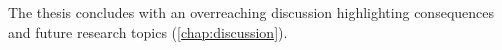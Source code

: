 \noindent The thesis concludes with an overreaching discussion highlighting consequences and future research topics (\autoref{chap:discussion}). 






































